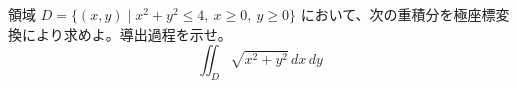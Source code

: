 
領域 $D = \{(x,y) \mid x^{2} + y^{2} \le 4,\ x \ge 0,\ y \ge 0\}$ において、次の重積分を極座標変換により求めよ。導出過程を示せ。
\[
\iint_{D} \sqrt{x^{2} + y^{2}}\,dx\,dy
\]
